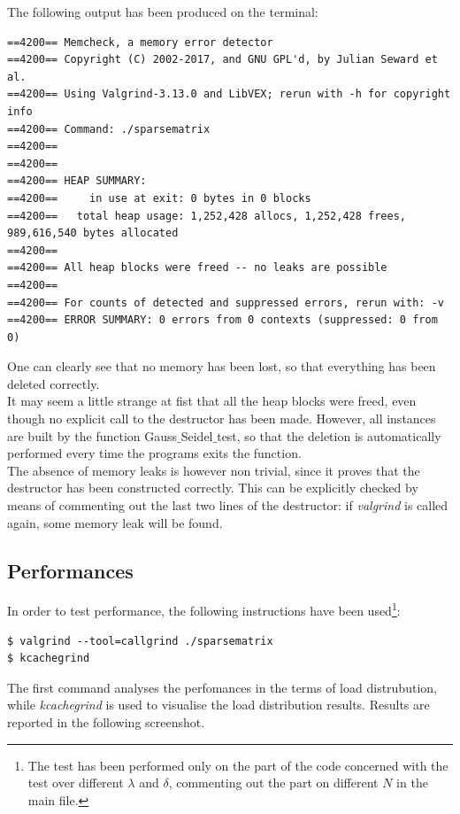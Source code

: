 \documentclass{article}
\theoremstyle{theorem}
\theoremstyle{definition}
\begin{document}
The following output has been produced on the terminal:

\begin{verbatim}
==4200== Memcheck, a memory error detector
==4200== Copyright (C) 2002-2017, and GNU GPL'd, by Julian Seward et al.
==4200== Using Valgrind-3.13.0 and LibVEX; rerun with -h for copyright info
==4200== Command: ./sparsematrix
==4200== 
==4200== 
==4200== HEAP SUMMARY:
==4200==     in use at exit: 0 bytes in 0 blocks
==4200==   total heap usage: 1,252,428 allocs, 1,252,428 frees, 989,616,540 bytes allocated
==4200== 
==4200== All heap blocks were freed -- no leaks are possible
==4200== 
==4200== For counts of detected and suppressed errors, rerun with: -v
==4200== ERROR SUMMARY: 0 errors from 0 contexts (suppressed: 0 from 0)
\end{verbatim}

One can clearly see that no memory has been lost, so that everything has been deleted correctly. \\
It may seem a little strange at fist that all the heap blocks were freed, even though no explicit call to the destructor has been made. However, all instances are built by the function Gauss$\_$Seidel$\_$test, so that the deletion is automatically performed every time the programs exits the function.\\
The absence of memory leaks is however non trivial, since it proves that the destructor has been constructed correctly. This can be explicitly checked by means of commenting out the last two lines of the destructor: if \emph{valgrind} is called again, some memory leak will be found.\\ 


\subsection{Performances}
\label{subsec:perf}
In order to test performance, the following instructions have been used\footnote{The test has been performed only on the part of the code concerned with the test over different $\lambda$ and $\delta$, commenting out the part on different $N$ in the main file. }:
\begin{verbatim}
$ valgrind --tool=callgrind ./sparsematrix
$ kcachegrind
\end{verbatim}

The first command analyses the perfomances in the terms of load distrubution, while \emph{kcachegrind} is used to visualise the load distribution results. Results are reported in the following screenshot.
\end{document}
